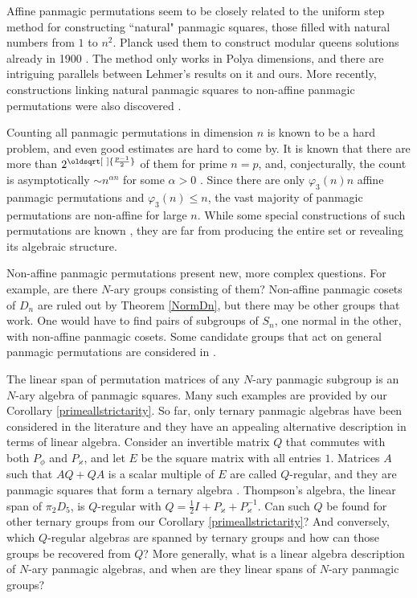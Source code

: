\documentclass[11pt]{article}
\renewcommand*{\sqrt}[2][\ ]{\oldsqrt[#1]{#2}}
\theoremstyle{plain}
\theoremstyle{definition}
\newcommand{\+}[1]{{#1}^\times}
\def\a{{\alpha}}
\def\k{{\varkappa}}
\def\pfi{{\varphi}}
\begin{document}
Affine panmagic permutations seem to be closely related to the uniform step method for constructing ``natural" panmagic squares, those filled with natural numbers from $1$ to $n^2$. Planck used them to construct modular queens solutions already in 1900 \cite{BS2}. The method only works in Polya dimensions, and there are intriguing parallels between Lehmer's results on it \cite{Lehm} and ours. More recently, constructions linking natural panmagic squares to non-affine panmagic permutations were also discovered \cite{BS1}.

Counting all panmagic permutations in dimension $n$ is known to be a hard problem, and even good estimates are hard to come by. It is known that there are more than $2^{\sqrt{\frac{p-1}2}}$ of them for prime $n=p$, and, conjecturally, the count is asymptotically $\sim n^{\a n}$ for some $\a>0$ \cite{BS2}. Since there are only $\pfi_3(n)n$ affine panmagic permutations and $\pfi_3(n)\leq n$, the vast majority of panmagic permutations are non-affine for large $n$. While some special constructions of such permutations are known \cite{BS2}, they are far from producing the entire set or revealing its algebraic structure. 

Non-affine panmagic permutations present new, more complex questions. For example, are there $N$-ary groups consisting of them? Non-affine panmagic cosets of $D_n$ are ruled out by Theorem \ref{NormDn}, but there may be other groups that work. One would have to find pairs of subgroups of $S_n$, one normal in the other, with non-affine panmagic cosets. Some candidate groups that act on general panmagic permutations are considered in \cite{Eng}.

The linear span of permutation matrices of any $N$-ary panmagic subgroup is an $N$-ary algebra of panmagic squares. Many such examples are provided by our Corollary \ref{primeallstrictarity}. So far, only ternary panmagic algebras have been considered in the literature and they have an appealing alternative description in terms of linear algebra. Consider an invertible matrix $Q$ that commutes with both $P_{\phi}$ and $P_{\k}$, and let $E$ be the square matrix with all entries $1$. Matrices $A$ such that $AQ+QA$ is a scalar multiple of $E$ are called $Q$-regular, and they are panmagic squares that form a ternary algebra \cite{Nord}. Thompson's algebra, the linear span of $\pi_2D_5$, is $Q$-regular with $Q=\frac12I+P_{\k}+P_{\k}^{-1}$. Can such $Q$ be found for other ternary groups from our Corollary \ref{primeallstrictarity}? And conversely, which $Q$-regular algebras are spanned by ternary groups and how can those groups be recovered from $Q$? More generally, what is a linear algebra description of $N$-ary panmagic algebras, and when are they linear spans of $N$-ary panmagic groups?
\end{document}
